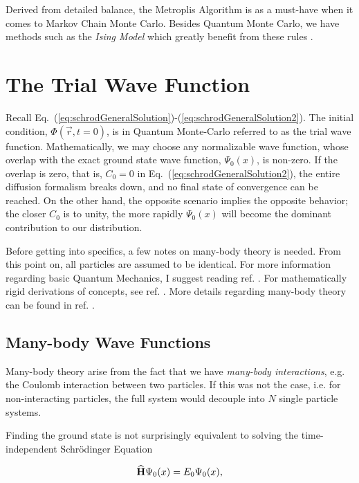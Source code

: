 Derived from detailed balance, the Metroplis Algorithm is as a must-have when it comes to Markov Chain Monte Carlo. Besides Quantum Monte Carlo, we have methods such as the \textit{Ising Model} which greatly benefit from these rules \cite{morten}.

\section{The Trial Wave Function}

Recall Eq.~(\ref{eq:schrodGeneralSolution})-(\ref{eq:schrodGeneralSolution2}). The initial condition, $\Phi(\vec r, t=0)$,
is in Quantum Monte-Carlo referred to as the trial wave function. Mathematically, we may choose any normalizable wave function, whose overlap with the exact ground state wave function, $\Psi_0(x)$, is non-zero. If the overlap is zero, that is, $C_0=0$ in Eq.~(\ref{eq:schrodGeneralSolution2}), the entire diffusion formalism breaks down, and no final state of convergence can be reached. On the other hand, the opposite scenario implies the opposite behavior; the closer $C_0$ is to unity, the more rapidly $\Psi_0(x)$ will become the dominant contribution to our distribution. 

Before getting into specifics, a few notes on many-body theory is needed. From this point on, all particles are assumed to be identical. For more information regarding basic Quantum Mechanics, I suggest reading ref. \cite{griffiths}. For mathematically rigid derivations of concepts, see ref. \cite{Sakurai:94}. More details regarding many-body theory can be found in ref. \cite{Shavitt}. 

\subsection{Many-body Wave Functions}
\label{sec:manyBodyWFs}

Many-body theory arise from the fact that we have \textit{many-body interactions}, e.g. the Coulomb interaction between two particles. If this was not the case, i.e. for non-interacting particles, the full system would decouple into $N$ single particle systems.

Finding the ground state is not surprisingly equivalent to solving the time-independent Schrödinger Equation

\begin{equation}
 {\bf\widehat{H}}\Psi_0(x) = E_0\Psi_0(x),
 \end{equation}
 
